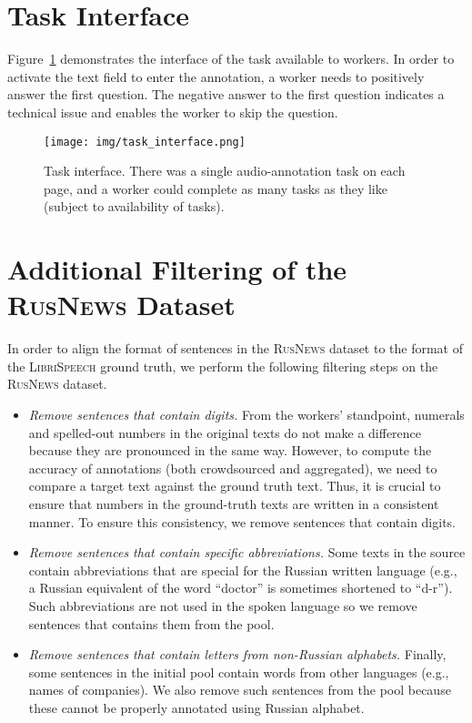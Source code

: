 \documentclass{article}
\newcommand{\libri}{\textsc{LibriSpeech}}
\newcommand{\news}{\textsc{RusNews}}
\begin{document}
\newpage

\section{Task Interface}
\label{section:screenshot}

Figure~\ref{fig:task_interface} demonstrates the interface of the task available to workers. In order to activate the text field to enter the 
annotation, a worker needs to positively answer the first question. The negative answer to the first question indicates a technical issue and enables the worker to skip the question.

\begin{figure}[h]
    \centering
    \texttt{[image: img/task\_interface.png]}
    \caption{Task interface. There was a single audio-annotation task on each page, and a worker could complete as many tasks as they like (subject to availability of tasks).}
    \label{fig:task_interface}
\end{figure}

\section{Additional Filtering of the \news{} Dataset}
\label{section:filtering}

In order to align the format of sentences in the \news{} dataset to the format of the \libri{} ground truth, we perform the following filtering steps on the \news{} dataset.

\begin{itemize}
  \item \emph{Remove sentences that contain digits.} From the workers' standpoint, numerals and spelled-out numbers in the original texts do not make a difference because they are pronounced in the same way. However, to compute the accuracy of annotations (both crowdsourced and aggregated), we need to compare a target text against the ground truth text. Thus, it is crucial to ensure that numbers in the ground-truth texts are written in a consistent  manner. To ensure this consistency, we remove sentences that contain digits.
  
  \item \emph{Remove sentences that contain specific abbreviations.} Some texts in the source contain abbreviations that are special for the Russian written language (e.g., a Russian equivalent of the word ``doctor'' is sometimes shortened to ``d-r''). Such abbreviations are not used in the spoken language so we remove sentences that contains them from the pool.
  
  \item \emph{Remove sentences that contain letters from non-Russian alphabets.} Finally, some sentences in the initial pool contain words from other languages (e.g., names of companies). We also remove such sentences from the pool because these cannot be properly annotated using Russian alphabet.
  
\end{itemize}
\end{document}
